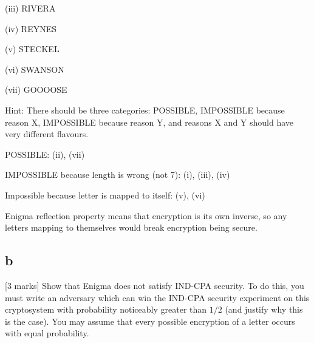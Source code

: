 \documentclass[11pt]{article}
\begin{document}
(iii) RIVERA

(iv) REYNES

(v) STECKEL

(vi) SWANSON

(vii) GOOOOSE

Hint: There should be three categories: POSSIBLE, IMPOSSIBLE because reason X, IMPOSSIBLE because reason Y, and reasons X and Y should have very diﬀerent ﬂavours.

POSSIBLE: (ii), (vii)

IMPOSSIBLE because length is wrong (not 7): (i), (iii), (iv)

Impossible because letter is mapped to itself: (v), (vi)

Enigma reflection property means that encryption is its own inverse, so any letters mapping to themselves would break encryption being secure.

\subsection{b}

[3 marks] Show that Enigma does not satisfy IND-CPA security. To do this, you must write an adversary which can win the IND-CPA security experiment on this cryptosystem with probability noticeably greater than $1/2$ (and justify why this is the case). You may assume that every possible encryption of a letter occurs with equal probability.
\end{document}
